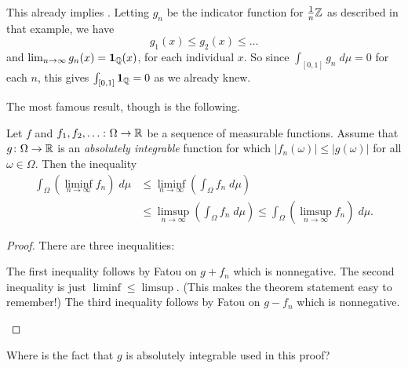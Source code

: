 \begin{example}
	This already implies .
	Letting $g_n$ be the indicator function for $\frac1n\mathbb Z$
	as described in that example, we have
	\[ g_1(x) \le g_2(x) \le \dots \]
	and $\lim_{n \to \infty} g_n(x) = \mathbf{1}_\mathbb Q(x)$,
	for each individual $x$.
	So since $\int_{[0,1]} g_n \; d\mu = 0$ for each $n$,
	this gives $\int_{[0,1]} \mathbf{1}_\mathbb Q = 0$ as we already knew.
\end{example}

The most famous result, though is the following.
\begin{corollary}
	Let $f$ and $f_1, f_2, \dots \colon \Omega \to \mathbb R$
	be a sequence of measurable functions.
	Assume that $g \colon \Omega \to \mathbb R$ is an
	\emph{absolutely integrable} function for which
	$|f_n(\omega)| \le |g(\omega)|$ for all $\omega \in \Omega$.
	Then the inequality
	\begin{align*}
		\int_\Omega \left( \liminf_{n \to \infty} f_n \right) \; d\mu
		&\le \liminf_{n \to \infty} \left( \int_\Omega f_n \; d\mu \right) \\
		&\le \limsup_{n \to \infty} \left( \int_\Omega f_n \; d\mu \right)
		\le \int_\Omega \left( \limsup_{n \to \infty} f_n \right) \; d\mu.
	\end{align*}
\end{corollary}
\begin{proof}
	There are three inequalities:
	\begin{itemize}
		\ii The first inequality follows by Fatou on $g + f_n$ which is nonnegative.
		\ii The second inequality is just $\liminf \le \limsup$.
		(This makes the theorem statement easy to remember!)
		\ii The third inequality follows by Fatou on $g - f_n$ which is nonnegative.
		\qedhere
	\end{itemize}
\end{proof}

\begin{exercise}
	Where is the fact that $g$ is absolutely integrable used in this proof?
\end{exercise}


